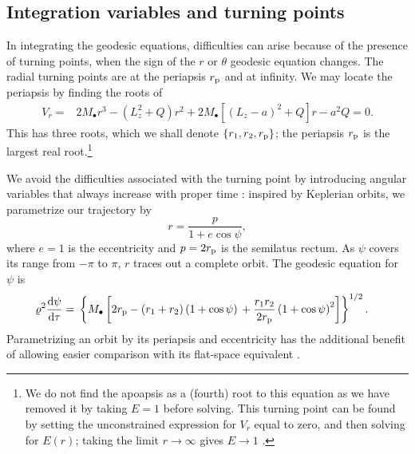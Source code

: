 \subsection{Integration variables and turning points}

In integrating the geodesic equations, difficulties can arise because of the presence of turning points, when the sign of the $r$ or $\theta$ geodesic equation changes. The radial turning points are at the periapsis $r_\mathrm{p}$ and at infinity. We may locate the periapsis by finding the roots of
\begin{align}
V_r = {} & 2M_\bullet r^3 - \left(L_z^2+Q\right)r^2 + 2M_\bullet\left[\left(L_z - a\right)^2 + Q\right]r - a^2 Q = {} 0.
\end{align}
This has three roots, which we shall denote $\{r_1, r_2, r_\mathrm{p}\}$; the periapsis $r_\mathrm{p}$ is the largest real root.\footnote{We do not find the apoapsis as a (fourth) root to this equation as we have removed it by taking $E = 1$ before solving. This turning point can be found by setting the unconstrained expression for $V_r$ equal to zero, and then solving for $E(r)$; taking the limit $r \rightarrow \infty$ gives $E \rightarrow 1$ \citep{Wilkins1972}.}

We avoid the difficulties associated with the turning point by introducing angular variables that always increase with proper time \citep{Drasco2004}: inspired by Keplerian orbits, we parametrize our trajectory by
\begin{equation}
r = \frac{p}{1+e\cos\psi},
\end{equation}
where $e = 1$ is the eccentricity and $p = 2r_\mathrm{p}$ is the semilatus rectum. As $\psi$ covers its range from $-\pi$ to $\pi$, $r$ traces out a complete orbit. The geodesic equation for $\psi$ is
\begin{align}
\varrho^2 \diff{\psi}{\tau} = {} & \left\{M_\bullet\left[2r\sub{p} - \left(r_1 + r_2\right)\left(1 + \cos\psi\right) \vphantom{\frac{r_1 r_2}{2r\sub{p}}} +  \frac{r_1 r_2}{2r\sub{p}}\left(1 + \cos\psi\right)^2\right]\right\}^{1/2}.
\end{align}
Parametrizing an orbit by its periapsis and eccentricity has the additional benefit of allowing easier comparison with its flat-space equivalent \citep{Gair2005}.

